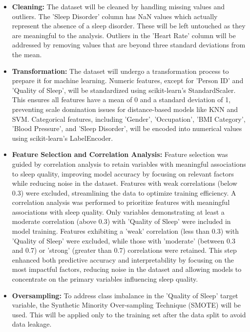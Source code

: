 \documentclass[conference]{IEEEtran}
\begin{document}
\begin{itemize}
\item \textbf{Cleaning:} The dataset will be cleaned by handling missing values and outliers. The 'Sleep Disorder' column has NaN values which actually represent the absence of a sleep disorder. These will be left untouched as they are meaningful to the analysis. Outliers in the 'Heart Rate' column will be addressed by removing values that are beyond three standard deviations from the mean.
   
\item \textbf{Transformation:} The dataset will undergo a transformation process to prepare it for machine learning. Numeric features, except for 'Person ID' and 'Quality of Sleep', will be standardized using scikit-learn's StandardScaler. This ensures all features have a mean of 0 and a standard deviation of 1, preventing scale domination issues for distance-based models like KNN and SVM. Categorical features, including 'Gender', 'Occupation', 'BMI Category', 'Blood Pressure', and 'Sleep Disorder', will be encoded into numerical values using scikit-learn's LabelEncoder. 

\item \textbf{Feature Selection and Correlation Analysis:} Feature selection was guided by correlation analysis to retain variables with meaningful associations to sleep quality, improving model accuracy by focusing on relevant factors while reducing noise in the dataset. Features with weak correlations (below 0.3) were excluded, streamlining the data to optimize training efficiency. A correlation analysis was performed to prioritize features with meaningful associations with sleep quality. Only variables demonstrating at least a moderate correlation (above 0.3) with 'Quality of Sleep' were included in model training. Features exhibiting a 'weak' correlation (less than 0.3) with 'Quality of Sleep' were excluded, while those with 'moderate' (between 0.3 and 0.7) or 'strong' (greater than 0.7) correlations were retained. This step enhanced both predictive accuracy and interpretability by focusing on the most impactful factors, reducing noise in the dataset and allowing models to concentrate on the primary variables influencing sleep quality. 

\item \textbf{Oversampling:} To address class imbalance in the 'Quality of Sleep' target variable, the Synthetic Minority Over-sampling Technique (SMOTE) will be used. This will be applied only to the training set after the data split to avoid data leakage. 
\end{itemize}
\end{document}
